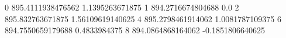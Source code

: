 0 895.4111938476562 1.1395263671875
1 894.2716674804688 0.0
2 895.832763671875 1.56109619140625
4 895.2798461914062 1.0081787109375
6 894.7550659179688 0.4833984375
8 894.0864868164062 -0.1851806640625
